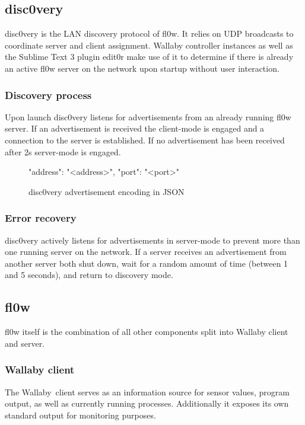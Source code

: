 \documentclass[conference,a4paper]{IEEEtran}
\begin{document}
\subsection{disc0very}
disc0very\cite{disc0very:Christoph Heiss} is the LAN discovery protocol of fl0w. It relies on UDP\cite{UDP:J. Postel} broadcasts to coordinate server and client assignment. Wallaby controller instances as well as the Sublime Text 3 plugin edit0r make use of it to determine if there is already an active fl0w server on the network upon startup without user interaction.


\subsubsection{Discovery process}
Upon launch disc0very listens for advertisements from an already running fl0w server. If an advertisement is received the client-mode is engaged and a connection to the server is established. If no advertisement has been received after 2s server-mode is engaged.

\begin{figure}[H]
\centering
\begin{json}
{
    "address": "<address>",
    "port": "<port>"
}
\end{json}
\caption{disc0very advertisement encoding in JSON}
\label{fig:discovery_advertisement}
\end{figure}

\subsubsection{Error recovery}
disc0very actively listens for advertisements in server-mode to prevent more than one running server on the network. If a server receives an advertisement from another server both shut down, wait for a random amount of time (between 1 and 5 seconds), and return to discovery mode. 


\subsection{fl0w}
fl0w itself is the combination of all other components split into Wallaby client and server.\\

\subsubsection{Wallaby client}
The Wallaby\ client serves as an information source for sensor values, program output, as well as currently running processes. Additionally it exposes its own standard output for monitoring purposes.\\
\end{document}
